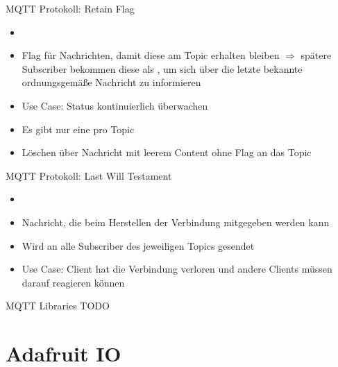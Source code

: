 \begin{frame}{MQTT Protokoll: Retain Flag}   
      \begin{itemize}
        \setlength{\itemindent}{0.75in}
        \item [\textbf{Retain Flag}]
    \end{itemize}
    \begin{itemize}
        \item Flag für Nachrichten, damit diese am Topic erhalten bleiben $\Rightarrow$  spätere Subscriber bekommen diese als , um sich über die letzte bekannte ordnungsgemäße Nachricht zu informieren
        \item Use Case: Status kontinuierlich überwachen
        \item Es gibt nur eine pro Topic
        \item Löschen über Nachricht mit leerem Content ohne Flag an das Topic
     \end{itemize} 
\end{frame}

\begin{frame}{MQTT Protokoll: Last Will Testament}   
         \begin{itemize}
        \setlength{\itemindent}{1.2in}
        \item [\textbf{Last Will Testament}]
    \end{itemize}
    \begin{itemize}
        \item Nachricht, die beim Herstellen der Verbindung mitgegeben werden kann
         \item Wird an alle Subscriber des jeweiligen Topics gesendet
         \item Use Case: Client hat die Verbindung verloren und andere Clients müssen darauf reagieren können
    \end{itemize} 
\end{frame}


\begin{frame}{MQTT Libraries}
    TODO
\end{frame}


\section{Adafruit IO}

